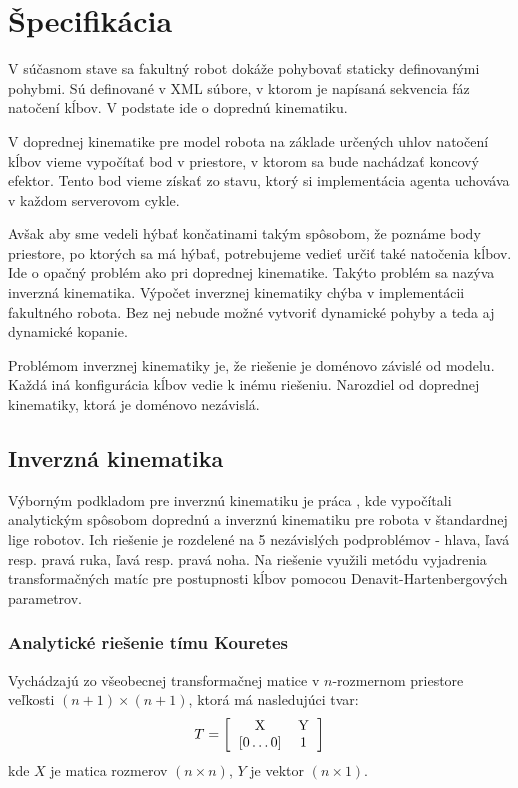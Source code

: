 \section{Špecifikácia} \label{sec_specification}

V súčasnom stave sa fakultný robot dokáže pohybovať staticky definovanými pohybmi. Sú definované v XML súbore, v ktorom je napísaná sekvencia fáz natočení kĺbov. V podstate ide o doprednú kinematiku.

V doprednej kinematike pre model robota na základe určených uhlov natočení kĺbov vieme vypočítať bod v priestore, v ktorom sa bude nachádzať koncový efektor. Tento bod vieme získať zo stavu, ktorý si implementácia agenta uchováva v každom serverovom cykle.

Avšak aby sme vedeli hýbať končatinami takým spôsobom, že poznáme body priestore, po ktorých sa má hýbať, potrebujeme vedieť určiť také natočenia kĺbov. Ide o opačný problém ako pri doprednej kinematike. Takýto problém  sa nazýva inverzná kinematika. Výpočet inverznej kinematiky chýba v implementácii fakultného robota. Bez nej nebude možné vytvoriť dynamické pohyby a teda aj dynamické kopanie.

Problémom inverznej kinematiky je, že riešenie je doménovo závislé od modelu. Každá iná konfigurácia kĺbov vedie k inému riešeniu. Narozdiel od doprednej kinematiky, ktorá je doménovo nezávislá.

\subsection{Inverzná kinematika}

Výborným podkladom pre inverznú kinematiku je práca \cite{kofinas, kofinas_master}, kde vypočítali analytickým spôsobom doprednú a inverznú kinematiku pre robota v štandardnej lige robotov. Ich riešenie je rozdelené na 5 nezávislých podproblémov - hlava, ľavá resp. pravá ruka, ľavá resp. pravá noha. Na riešenie využili metódu vyjadrenia transformačných matíc pre postupnosti kĺbov pomocou Denavit-Hartenbergových parametrov.

\subsubsection{Analytické riešenie tímu Kouretes}
Vychádzajú zo všeobecnej transformačnej matice v $n$-rozmernom priestore veľkosti $(n+1)\times (n+1)$, ktorá má nasledujúci tvar:
\begin{equation}
	T = \left[
	\begin{tabular}{cc}
		X & Y \\
		$[0\ldots0]$ & 1
	\end{tabular}
	\right]
\end{equation}
kde $X$ je matica rozmerov $(n\times n)$, $Y$ je vektor $(n \times 1)$.
\\

